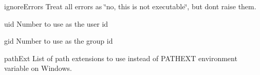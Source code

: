 \begin{DoxyItemize}
\item {\ttfamily ignore\+Errors} Treat all errors as \char`\"{}no, this is not executable\char`\"{}, but don\textquotesingle{}t raise them.
\item {\ttfamily uid} Number to use as the user id
\item {\ttfamily gid} Number to use as the group id
\item {\ttfamily path\+Ext} List of path extensions to use instead of {\ttfamily P\+A\+T\+H\+E\+XT} environment variable on Windows. 
\end{DoxyItemize}